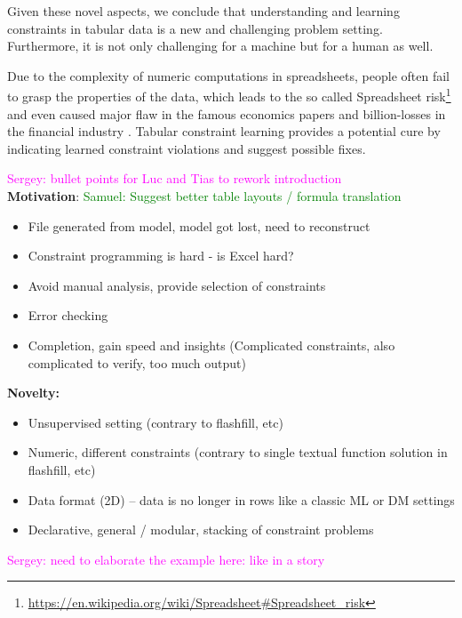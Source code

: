 \documentclass{ecai}
\newcommand{\sergey}[1]{\textcolor{magenta}{{\sc Sergey:} #1}\xspace}
\newcommand{\samuel}[1]{\textcolor{green}{{\sc Samuel:} #1}\xspace}
\begin{document}
Given these novel aspects, we conclude that understanding and learning constraints in tabular data is a new and challenging problem setting.
Furthermore, it is not only challenging for a machine but for a human as well.

Due to the complexity of numeric computations in spreadsheets, people often fail to grasp the properties of the data, which leads to the so called Spreadsheet risk\footnote{\url{https://en.wikipedia.org/wiki/Spreadsheet\#Spreadsheet_risk}} and even caused major flaw in the famous economics papers \cite{flaw_excel} and billion-losses in the financial industry \cite{spreadsheet_risk_loss}. Tabular constraint learning provides a potential cure by indicating learned constraint violations and suggest possible fixes.

\sergey{bullet points for Luc and Tias to rework introduction}\\
\textbf{Motivation}:
\samuel{Suggest better table layouts / formula translation}
\begin{itemize}
  \item File generated from model, model got lost, need to reconstruct
  \item Constraint programming is hard - is Excel hard?
  \item Avoid manual analysis, provide selection of constraints
  \item Error checking
  \item Completion, gain speed and insights (Complicated constraints, also complicated to verify, too much output)
\end{itemize}

\textbf{Novelty:}
\begin{itemize}
  \item Unsupervised setting (contrary to flashfill, etc)
  \item Numeric, different constraints (contrary to single textual function solution in flashfill, etc)
  \item Data format (2D) -- data is no longer in rows like a classic ML or DM settings
  \item Declarative, general / modular, stacking of constraint problems
\end{itemize}

\sergey{need to elaborate the example here: like in a story}
\end{document}
